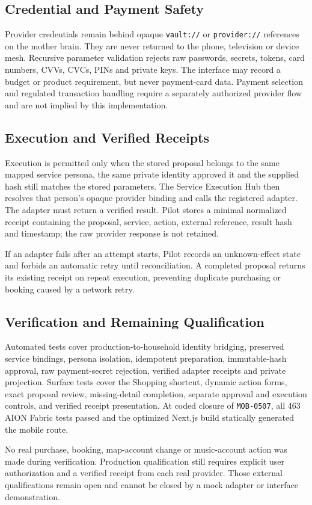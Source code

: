 \subsection{Credential and Payment Safety}

Provider credentials remain behind opaque \texttt{vault://} or \texttt{provider://} references on
the mother brain.  They are never returned to the phone, television or device mesh.  Recursive
parameter validation rejects raw passwords, secrets, tokens, card numbers, CVVs, CVCs, PINs and
private keys.  The interface may record a budget or product requirement, but never payment-card
data.  Payment selection and regulated transaction handling require a separately authorized
provider flow and are not implied by this implementation.

\subsection{Execution and Verified Receipts}

Execution is permitted only when the stored proposal belongs to the same mapped service persona,
the same private identity approved it and the supplied hash still matches the stored parameters.
The Service Execution Hub then resolves that person's opaque provider binding and calls the
registered adapter.  The adapter must return a verified result.  Pilot stores a minimal normalized
receipt containing the proposal, service, action, external reference, result hash and timestamp;
the raw provider response is not retained.

If an adapter fails after an attempt starts, Pilot records an unknown-effect state and forbids an
automatic retry until reconciliation.  A completed proposal returns its existing receipt on repeat
execution, preventing duplicate purchasing or booking caused by a network retry.

\subsection{Verification and Remaining Qualification}

Automated tests cover production-to-household identity bridging, preserved service bindings,
persona isolation, idempotent preparation, immutable-hash approval, raw payment-secret rejection,
verified adapter receipts and private projection.  Surface tests cover the Shopping shortcut,
dynamic action forms, exact proposal review, missing-detail completion, separate approval and
execution controls, and verified receipt presentation.  At coded closure of \texttt{MOB-0507}, all
463 AION Fabric tests passed and the optimized Next.js build statically generated the mobile route.

No real purchase, booking, map-account change or music-account action was made during verification.
Production qualification still requires explicit user authorization and a verified receipt from
each real provider.  Those external qualifications remain open and cannot be closed by a mock
adapter or interface demonstration.
